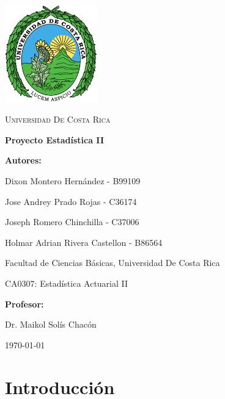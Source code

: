 \documentclass[12pt, a4paper]{article}
\begin{document}
\begin{titlepage}
    \centering

    \includegraphics[width=0.3\textwidth]{LogoUCR.png}\par\vspace{1cm}

    {\scshape\LARGE Universidad De Costa Rica \par}
    \vspace{1.5cm}

    {\Huge\bfseries Proyecto Estadística II\par}
    \vspace{1.5cm}

    {\large \bfseries Autores:\par}
    {\Large Dixon Montero Hernández - B99109 \par}
    {\Large Jose Andrey Prado Rojas - C36174 \par}
    {\Large Joseph Romero Chinchilla - C37006\par}
    {\Large Holmar Adrian Rivera Castellon - B86564\par}
    \vspace{0.5cm}
    {\large Facultad de Ciencias Básicas, Universidad De Costa Rica\par}
    {\large CA0307: Estadística Actuarial II}
    \vspace{1cm}

    {\large\bfseries Profesor:\par}
    {\large Dr. Maikol Solís Chacón}

    \vfill

    {\large \today\par}
\end{titlepage}

\section*{Introducción}
\end{document}
